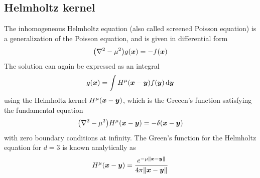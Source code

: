 \subsection{Helmholtz kernel}
The inhomogeneous Helmholtz equation (also called screened Poisson equation) 
is a generalization of the Poisson equation, and is given in differential form
\begin{equation}
    \big(\nabla^2 - \mu^2\big) g(\boldsymbol x) = -f(\boldsymbol x)
\end{equation}
The solution can again be expressed as an integral
\begin{equation}
    g(\boldsymbol x) = \int H^\mu(\boldsymbol x-\boldsymbol y)f(\boldsymbol y)\,\mathrm{d}\boldsymbol y
\end{equation}
using the Helmholtz kernel $H^\mu(\boldsymbol x-\boldsymbol y)$, which is the Greeen's function 
satisfying the fundamental equation
\begin{equation}
    \label{eq:fundamental_helmholtz}
    \big(\nabla^2 - \mu^2\big) H^\mu(\boldsymbol x-\boldsymbol y) = -\delta(\boldsymbol x-\boldsymbol y)
\end{equation}
with zero boundary conditions at infinity. The Green's function for the Helmholtz 
equation for $d=3$ is known analytically as
\begin{equation}
    \label{eq:helmholtz_kern}
    H^\mu(\boldsymbol x-\boldsymbol y) = \frac{e^{-\mu\|\boldsymbol x-\boldsymbol y\|}}{4\pi\|\boldsymbol x-\boldsymbol y\|}
\end{equation}

